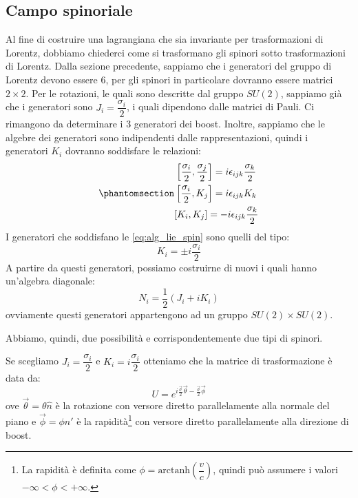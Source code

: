 \subsection{Campo spinoriale}
Al fine di costruire una lagrangiana che sia invariante per trasformazioni di Lorentz, dobbiamo chiederci come si trasformano gli spinori sotto trasformazioni di Lorentz. Dalla sezione precedente, sappiamo che i generatori del gruppo di Lorentz devono essere $6$, per gli spinori in particolare dovranno essere matrici $2\times2$. Per le rotazioni, le quali sono descritte dal gruppo $SU(2)$, sappiamo già che i generatori sono $J_i=\dfrac{\sigma_i}{2}$, i quali dipendono dalle matrici di Pauli. Ci rimangono da determinare i $3$ generatori dei boost. Inoltre, sappiamo che le algebre dei generatori sono indipendenti dalle rappresentazioni, quindi i generatori $K_i$ dovranno soddisfare le relazioni:
\begin{equation}\phantomsection\label{eq:alg_lie_spin}
    \begin{gathered}
        \left[\dfrac{\sigma_i}{2},\dfrac{\sigma_j}{2}\right]=i\epsilon_{ijk}\dfrac{\sigma_k}{2}\\
        \left[\dfrac{\sigma_i}{2},K_j\right]=i\epsilon_{ijk}K_k\\
         \left[K_i,K_j\right]=-i\epsilon_{ijk}\dfrac{\sigma_k}{2}
    \end{gathered}
\end{equation}
I generatori che soddisfano le \eqref{eq:alg_lie_spin} sono quelli del tipo:
\begin{equation}
    K_i=\pm i\dfrac{\sigma_i}{2}
\end{equation}
A partire da questi generatori, possiamo costruirne di nuovi i quali hanno un'algebra diagonale:
\begin{equation}
    N_i=\dfrac{1}{2}(J_i+iK_i)
\end{equation}
ovviamente questi generatori appartengono ad un gruppo $SU(2)\times SU(2)$.

Abbiamo, quindi, due possibilità e corrispondentemente due tipi di spinori. 

Se scegliamo $J_i=\dfrac{\sigma_i}{2}$ e $K_i=i\dfrac{\sigma_i}{2}$ otteniamo che la matrice di trasformazione è data da:
\begin{equation}
    U=e^{i \frac{\Vec{\sigma}}{2}\Vec{\theta}-\frac{\Vec{\sigma}}{2}\Vec{\phi}}
\end{equation}
ove $\Vec{\theta}=\theta \hat{n}$ è la rotazione con versore diretto parallelamente alla normale del piano e $\Vec{\phi}=\phi \hat{n}'$ è la rapidità\footnote{La rapidità è definita come $\phi=\text{arctanh}(\dfrac{v}{c})$, quindi può assumere i valori $-\infty<\phi<+\infty$.} con versore diretto parallelamente alla direzione di boost.

